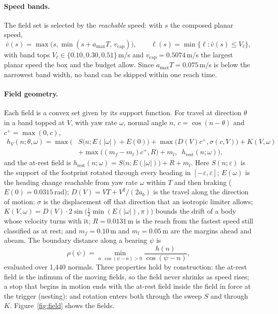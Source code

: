 \documentclass[11pt]{article}
\theoremstyle{definition}
\begin{document}
\paragraph{Speed bands.} The field set is selected by the \emph{reachable} speed: with $s$ the composed
planar speed,
\begin{equation}
\bar v(s)=\max\big(s,\min(s+a_{\max}T,\,v_{\mathrm{cap}})\big),\qquad
\ell(s)=\min\{\ell:\bar v(s)\le V_\ell\},
\label{eq:band}
\end{equation}
with band tops $V_\ell\in\{0.10,0.30,0.51\}$\,m/s and $v_{\mathrm{cap}}=0.5074$\,m/s the largest
planar speed the box and the budget allow. Since $a_{\max}T=0.075$\,m/s is below the narrowest band
width, no band can be skipped within one reach time.

\paragraph{Field geometry.} Each field is a convex set given by its support function. For travel at
direction $\theta$ in a band topped at $V$, with yaw rate $\omega$, normal angle $n$, $c=\cos(n-\theta)$
and $c^+=\max(0,c)$,
\begin{equation}
\begin{aligned}
h_V(n;\theta,\omega)=\max\Big(&S\big(n;E(|\omega|)+E(0)\big)+\max\big(D(V)c^+,\sigma(c,V)\big)+K(V,\omega)\\
&+\max\big((m_f-m_l)c^+,R\big)+m_l,\;\;h_{\mathrm{rest}}(n;\omega)\Big),
\end{aligned}
\label{eq:field}
\end{equation}
and the at-rest field is $h_{\mathrm{rest}}(n;\omega)=S\big(n;E(|\omega|)\big)+R+m_l$. Here
$S(n;\varepsilon)$ is the support of the footprint rotated through every heading in
$[-\varepsilon,\varepsilon]$; $E(\omega)$ is the heading change reachable from yaw rate $\omega$ within $T$
and then braking ($E(0)=0.0315$\,rad); $D(V)=VT+V^2/(2a_b)$ is the travel along the direction of motion;
$\sigma$ is the displacement off that direction that an isotropic limiter allows; $K(V,\omega)=D(V)\cdot
2\sin\big(\tfrac12\min(E(|\omega|),\pi)\big)$ bounds the drift of a body whose velocity turns with it;
$R=0.0131$\,m is the reach from the fastest speed still classified as at rest; and $m_f=0.10$\,m and
$m_l=0.05$\,m are the margins ahead and abeam. The boundary distance along a bearing $\psi$ is
\begin{equation}
\rho(\psi)=\min_{n:\cos(\psi-n)>0}\frac{h(n)}{\cos(\psi-n)},
\label{eq:extent}
\end{equation}
evaluated over 1{,}440 normals. Three properties hold by construction: the at-rest field is the infimum
of the moving fields, so the field never shrinks as speed rises; a stop that begins in motion ends with
the at-rest field inside the field in force at the trigger (nesting); and rotation enters both through the
sweep $S$ and through $K$. Figure~\ref{fig:field} shows the fields.
\end{document}
